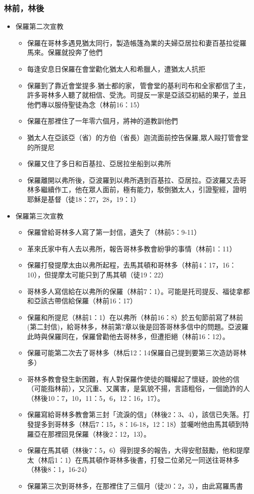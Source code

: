 \subsubsection{林前，林後}
\begin{itemize}%
\item 保羅第二次宣教
\begin{itemize}%
\itemsep-.25em 
\item 保羅在哥林多遇見猶太同行，製造帳篷為業的夫婦亞居拉和妻百基拉從羅馬來。保羅就投奔了他們
\item 每逢安息日保羅在會堂勸化猶太人和希臘人，遭猶太人抗拒
\item 保羅到了靠近會堂提多.猶士都的家， 管會堂的基利司布和全家都信了主，許多哥林多人聽了就相信、受洗。司提反一家是亞該亞初結的果子，並且他們專以服侍聖徒為念（林前16：15）
\item 保羅在那裡住了一年零六個月，將神的道教訓他們
\item 猶太人在亞該亞（省）的方伯（省長）迦流面前控告保羅,眾人毆打管會堂的所提尼
\item 保羅又住了多日和百基拉、亞居拉坐船到以弗所
\item 保羅離開以弗所後，亞波羅到以弗所遇到百基拉、亞居拉。亞波羅又去哥林多繼續作工，他在眾人面前，極有能力，駁倒猶太人，引證聖經，證明耶穌是基督（徒18：27，28，19：1）
\end{itemize}
\item 保羅第三次宣教
\begin{itemize}%
\itemsep-.25em 
\item 保羅曾給哥林多人寫了第一封信，遺失了（林前5：9-11）
\item 革來氏家中有人去以弗所，報告哥林多教會紛爭的事情（林前1：11）
\item 保羅打發提摩太由以弗所起程，去馬其頓和哥林多（林前4：17，16：10），但提摩太可能只到了馬其頓（徒19：22）
\item 哥林多人寫信給在以弗所的保羅（林前7：1）。可能是托司提反、福徒拿都和亞該古帶信給保羅（林前16：17）
\item 保羅和所提尼（林前1：1）在以弗所（林前16：8）於五旬節前寫了林前(第二封信)，給哥林多，林前第7章以後是回答哥林多信中的問題。亞波羅此時與保羅同在，保羅曾勸他去哥林多，但遭拒絕（林前16：12）。
\item 保羅可能第二次去了哥林多（林后12：14保羅自己提到要第三次造訪哥林多）
\item 哥林多教會發生新困難，有人對保羅作使徒的職權起了懷疑，說他的信（可能指林前），又沉重、又厲害，是氣貌不揚，言語粗俗，一個詭詐的人（林後10：7，10，11：5，6，12：16，17）。
\item 保羅寫給哥林多教會第三封「流淚的信」（林後2：3、4），該信已失落。打發提多到哥林多（林后7：15，8：16-18，12：18）並囑咐他由馬其頓到特羅亞在那裡回見保羅（林後2：12，13）。
\item 保羅在馬其頓（林後7：5，6）得到提多的報告，大得安慰鼓勵，他和提摩太（林后1：1）在馬其頓作哥林多後書，打發二位弟兄一同送往哥林多（林後8：1，16-24）
\item 保羅第三次到哥林多，在那裡住了三個月（徒20：2，3），由此寫羅馬書
\end{itemize}
\end{itemize}

